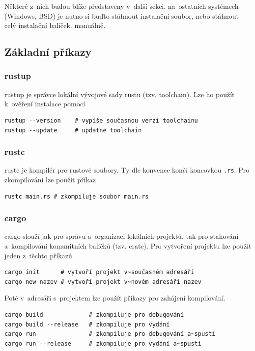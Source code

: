 \documentclass[a4paper, 12pt]{article} %
\begin{document}
		Některé z~nich budou blíže představeny v~další sekci.
		na~ostatních systémech (Windows, BSD) je nutno si buďto stáhnout instalační soubor, nebo stáhnout celý instalační balíček. manuálně\cite{rustdl}.

		\subsection{Základní příkazy}
			\subsubsection*{rustup}
				rustup je správce lokální vývojové sady rustu (tzv. toolchain). Lze ho použít k~ověření instalace pomocí
				\begin{verbatim}
rustup --version    # vypíše současnou verzi toolchainu
rustup --update     # updatne toolchain
				\end{verbatim}

			\subsubsection*{rustc}
				rustc je kompilér pro rustové soubory. Ty dle konvence končí koncovkou \texttt{.rs}. Pro zkompilování lze použít příkaz
				\begin{verbatim}
rustc main.rs # zkompiluje soubor main.rs
				\end{verbatim}
	
			\subsubsection*{cargo}
				cargo slouží jak pro správu a~organizaci lokálních projektů, tak pro stahování a~kompilování komunitních balíčků (tzv. crate). Pro vytvoření projektu lze použít jeden z~těchto příkazů
				\begin{verbatim}
cargo init      # vytvoří projekt v~současném adresáři
cargo new nazev # vytvoří projekt v~novém adresáři nazev  
					\end{verbatim}
	
				Poté v~adresáři s~projektem lze použít příkazy pro zahájení kompilování.
				\begin{verbatim}
cargo build             # zkompiluje pro debugování
cargo build --release   # zkompiluje pro vydání
cargo run               # zkompiluje pro debugování a~spustí
cargo run --release     # zkompiluje pro vydání a~spustí
				\end{verbatim}
	
\end{document}
